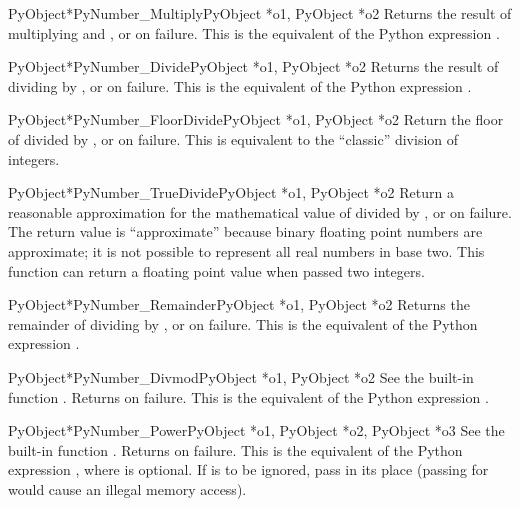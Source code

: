 \begin{cfuncdesc}{PyObject*}{PyNumber_Multiply}{PyObject *o1, PyObject *o2}
  Returns the result of multiplying  and , or \NULL{}
  on failure.  This is the equivalent of the Python expression
  .
\end{cfuncdesc}


\begin{cfuncdesc}{PyObject*}{PyNumber_Divide}{PyObject *o1, PyObject *o2}
  Returns the result of dividing  by , or \NULL{} on
  failure.  This is the equivalent of the Python expression
  .
\end{cfuncdesc}


\begin{cfuncdesc}{PyObject*}{PyNumber_FloorDivide}{PyObject *o1, PyObject *o2}
  Return the floor of  divided by , or \NULL{} on
  failure.  This is equivalent to the ``classic'' division of
  integers.
\end{cfuncdesc}


\begin{cfuncdesc}{PyObject*}{PyNumber_TrueDivide}{PyObject *o1, PyObject *o2}
  Return a reasonable approximation for the mathematical value of
   divided by , or \NULL{} on failure.  The return
  value is ``approximate'' because binary floating point numbers are
  approximate; it is not possible to represent all real numbers in
  base two.  This function can return a floating point value when
  passed two integers.
\end{cfuncdesc}


\begin{cfuncdesc}{PyObject*}{PyNumber_Remainder}{PyObject *o1, PyObject *o2}
  Returns the remainder of dividing  by , or \NULL{}
  on failure.  This is the equivalent of the Python expression
  .
\end{cfuncdesc}


\begin{cfuncdesc}{PyObject*}{PyNumber_Divmod}{PyObject *o1, PyObject *o2}
  See the built-in function .
  Returns \NULL{} on failure.  This is the equivalent of the Python
  expression .
\end{cfuncdesc}


\begin{cfuncdesc}{PyObject*}{PyNumber_Power}{PyObject *o1,
                                             PyObject *o2, PyObject *o3}
  See the built-in function .
  Returns \NULL{} on failure.  This is the equivalent of the Python
  expression , where 
  is optional.  If  is to be ignored, pass  in
  its place (passing \NULL{} for  would cause an illegal
  memory access).
\end{cfuncdesc}


